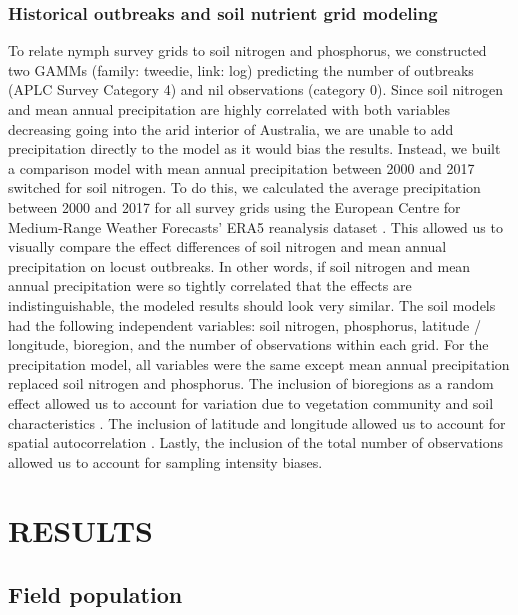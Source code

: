 \documentclass[
]{article}
\begin{document}
\subsubsection{Historical outbreaks and soil nutrient grid
modeling}\label{historical-outbreaks-and-soil-nutrient-grid-modeling}

To relate nymph survey grids to soil nitrogen and phosphorus, we
constructed two GAMMs (family: tweedie, link: log) predicting the number
of outbreaks (APLC Survey Category 4) and nil observations (category 0).
Since soil nitrogen and mean annual precipitation are highly correlated
with both variables decreasing going into the arid interior of
Australia, we are unable to add precipitation directly to the model as
it would bias the results. Instead, we built a comparison model with
mean annual precipitation between 2000 and 2017 switched for soil
nitrogen. To do this, we calculated the average precipitation between
2000 and 2017 for all survey grids using the European Centre for
Medium-Range Weather Forecasts' ERA5 reanalysis dataset
\citep{munoz-sabater_era5-land_2021}. This allowed us to visually
compare the effect differences of soil nitrogen and mean annual
precipitation on locust outbreaks. In other words, if soil nitrogen and
mean annual precipitation were so tightly correlated that the effects
are indistinguishable, the modeled results should look very similar. The
soil models had the following independent variables: soil nitrogen,
phosphorus, latitude / longitude, bioregion, and the number of
observations within each grid. For the precipitation model, all
variables were the same except mean annual precipitation replaced soil
nitrogen and phosphorus. The inclusion of bioregions as a random effect
allowed us to account for variation due to vegetation community and soil
characteristics \citep{lawton_seeing_2022}. The inclusion of latitude
and longitude allowed us to account for spatial autocorrelation
\citep{clayton_spatial_1993}. Lastly, the inclusion of the total number
of observations allowed us to account for sampling intensity biases.

\section{RESULTS}\label{results}

\subsection{Field population}\label{field-population-1}
\end{document}
